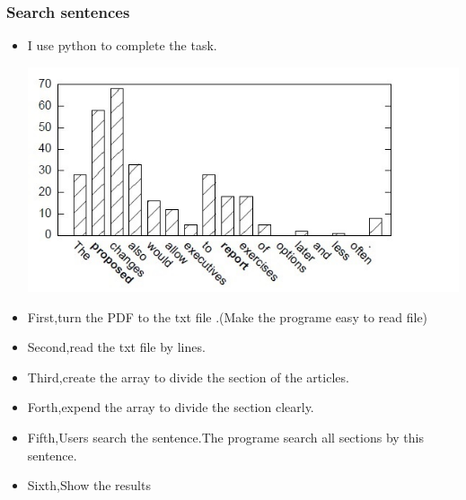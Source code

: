 \subsubsection*{Search sentences}
\begin{itemize}
	\item I use python to complete the task. 
	\begin{center}
		\includegraphics[width=0.8\columnwidth]{Union_Background_Chart_2}
	\end{center}
	\item First,turn the PDF to the txt file .(Make the programe easy to read file)\\ 
	\item Second,read the txt file by lines.\\ 	
	\item Third,create the array to divide the section of the articles.\\ 	
	\item Forth,expend the array to divide the section clearly.\\ 	
	\item Fifth,Users search the sentence.The programe search all sections by this sentence.\\
	\item Sixth,Show the results\\  		
	
\end{itemize}

\newpage %